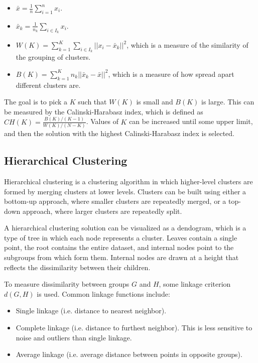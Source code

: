 \documentclass[12pt,titlepage]{article}
\begin{document}
        \begin{itemize}
          \item $\bar{x} = \frac{1}{n} \sum_{i=1}^n x_i$.
          \item $\bar{x}_k = \frac{1}{n_k} \sum_{i \in I_k} x_i$.
          \item $W(K) = \sum_{k=1}^K \sum_{i \in I_k} ||x_i - \bar{x}_k||^2$, which is a measure of the similarity of the grouping of clusters.
          \item $B(K) = \sum_{k=1}^K n_k ||\bar{x}_k - \bar{x}||^2$, which is a measure of how spread apart different clusters are.
        \end{itemize}

        The goal is to pick a $K$ such that $W(K)$ is small and $B(K)$ is large. This can be measured by the Calinski-Harabasz index, which is
        defined as $CH(K) = \frac{B(K)/(K-1)}{W(K)/(N - K)}$. Values of $K$ can be increased until some upper limit, and then the solution with
        the highest  Calinski-Harabasz index is selected.

    \subsection{Hierarchical Clustering}
      Hierarchical clustering is a clustering algorithm in which higher-level clusters are formed by merging clusters at lower levels. Clusters
      can be built using either a bottom-up approach, where smaller clusters are repeatedly merged, or a top-down approach, where larger clusters
      are repeatedly split.

      A hierarchical clustering solution can be visualized as a dendogram, which is a type of tree in which each node represents a cluster. Leaves
      contain a single point, the root contains the entire dataset, and internal nodes point to the subgroups from which form them. Internal nodes
      are drawn at a height that reflects the dissimilarity between their children.

      To measure dissimilarity between groups $G$ and $H$, some linkage criterion $d(G, H)$ is used. Common linkage functions include:
      \begin{itemize}
        \item Single linkage (i.e. distance to nearest neighbor).
        \item Complete linkage (i.e. distance to furthest neighbor). This is less sensitive to noise and outliers than single linkage.
        \item Average linkage (i.e. average distance between points in opposite groups).
      \end{itemize}
\end{document}
